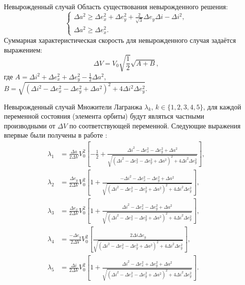 \documentclass[9pt]{beamer}
\begin{document}
\begin{frame}{Невырожденный случай}
Область существования невырожденного решения:
\begin{equation*}
\begin{cases}
    \Delta a^2 \geq \Delta e_x^2 + \Delta e_y^2 + \frac{2}{\sqrt{3}} \Delta e_y \Delta i - \Delta i^2, \\
    \Delta a^2 \geq \Delta e_x^2.
\end{cases}
\end{equation*}
Суммарная характеристическая скорость для невырожденного случая задаётся выражением:
\begin{equation*}
    \Delta V = V_0 \sqrt{\frac{1}{2}} \sqrt{A + B},
\end{equation*}
где $A = \Delta i^2 + \Delta e_x^2 + \Delta e_y^2 - \frac{1}{2} \Delta a^2$, $B = \sqrt{(\Delta i^2 - \Delta e_x^2 - \Delta e_y^2 + \Delta a^2)^2 + 4 \Delta i^2 \Delta e_y^2}$.
\end{frame}

\begin{frame}{Невырожденный случай}
Множители Лагранжа $\lambda_k$, $k \in \{1, 2, 3, 4, 5\}$, для каждой переменной состояния (элемента орбиты) будут являться частными производными от $\Delta V$ по соответствующей переменной. Следующие выражения впервые были получены в работе \cite{Edelbaum_1}:
\begin{align*}
    \lambda_1 &= \frac{\Delta a}{2 \Delta V} V_0^2 \left[ -\frac{1}{2} + \frac{\Delta i^2 - \Delta e_x^2 - \Delta e_y^2 + \Delta a^2}{\sqrt{(\Delta i^2 - \Delta e_x^2 - \Delta e_y^2 + \Delta a^2)^2 + 4 \Delta i^2 \Delta e_y^2}} \right], \\
    \lambda_2 &= \frac{\Delta e_y}{2 \Delta V} V_0^2 \left[ 1 + \frac{-\Delta i^2 - \Delta e_x^2 - \Delta e_y^2 + \Delta a^2}{\sqrt{(\Delta i^2 - \Delta e_x^2 - \Delta e_y^2 + \Delta a^2)^2 + 4 \Delta i^2 \Delta e_y^2}} \right], \\
    \lambda_3 &= \frac{\Delta e_x}{2 \Delta V} V_0^2 \left[ 1 + \frac{\Delta i^2 - \Delta e_x^2 - \Delta e_y^2 + \Delta a^2}{\sqrt{(\Delta i^2 - \Delta e_x^2 - \Delta e_y^2 + \Delta a^2)^2 + 4 \Delta i^2 \Delta e_y^2}} \right], \\
    \lambda_4 &= \frac{-\Delta e_y}{2 \Delta V} V_0^2 \left[ \frac{2 \Delta i \Delta e_y}{\sqrt{(\Delta i^2 - \Delta e_x^2 - \Delta e_y^2 + \Delta a^2)^2 + 4 \Delta i^2 \Delta e_y^2}} \right], \\
    \lambda_5 &= \frac{\Delta i}{2 \Delta V} V_0^2  \left[ 1 + \frac{\Delta i^2 - \Delta e_x^2 + \Delta e_y^2 + \Delta a^2}{\sqrt{(\Delta i^2 - \Delta e_x^2 - \Delta e_y^2 + \Delta a^2)^2 + 4 \Delta i^2 \Delta e_y^2}} \right].
\end{align*}
\end{frame}
\end{document}
